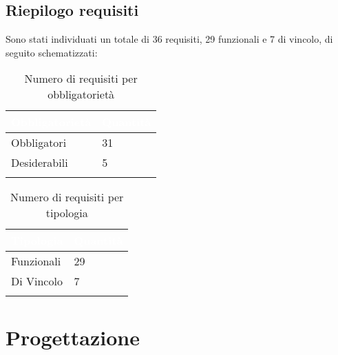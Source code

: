 \subsection{Riepilogo requisiti}
Sono stati individuati un totale di 36 requisiti, 29 funzionali e 7 di vincolo, di seguito schematizzati:
{
    \setlength{\freewidth}{\dimexpr\textwidth-10\tabcolsep}
    \renewcommand{\arraystretch}{1.5}
    \centering
    \setlength{\aboverulesep}{0pt}
    \setlength{\belowrulesep}{0pt}
    \begin{longtable}{C{.25\freewidth} C{.2\freewidth}} 
       \toprule
    \textcolor{white}{\textbf{Obbligatorietà}}&
    \textcolor{white}{\textbf{Quantità}}\\
    \toprule
    \endhead

    Obbligatori & 31\\
    Desiderabili & 5\\
    \bottomrule
    \caption{Numero di requisiti per obbligatorietà}
    \label{tab:requisiti-obbligatorieta}
    \end{longtable}
}

{
    \setlength{\freewidth}{\dimexpr\textwidth-10\tabcolsep}
    \renewcommand{\arraystretch}{1.5}
    \centering
    \setlength{\aboverulesep}{0pt}
    \setlength{\belowrulesep}{0pt}
    \begin{longtable}{C{.25\freewidth} C{.2\freewidth}} 
       \toprule
    \textcolor{white}{\textbf{Tipologia}}&
    \textcolor{white}{\textbf{Quantità}}\\
    \toprule
    \endhead

    Funzionali & 29\\
    Di Vincolo & 7\\
    \bottomrule
    \caption{Numero di requisiti per tipologia}
    \label{tab:requisiti-tipolgia}
    \end{longtable}
}



\section{Progettazione}

